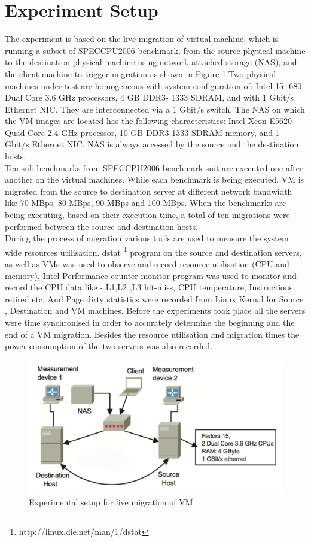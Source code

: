 \documentclass[a4paper,10pt,twoside]{article}
\begin{document}
\section{Experiment Setup}
The experiment is based on the live migration of virtual machine, which is running a subset of SPECCPU2006 benchmark, from the source physical machine to the destination physical machine using network attached storage (NAS), and the client machine to trigger migration as shown in Figure 1.Two physical machines under test are homogeneous with system configuration of:  Intel 15- 680 Dual Core 3.6 GHz processors, 4 GB DDR3- 1333 SDRAM, and with 1 Gbit/s Ethernet NIC. They are interconnected via a 1 Gbit/s switch. The NAS on which the VM images are located has the following characteristics: Intel Xeon E5620 Quad-Core 2.4 GHz processor, 10 GB DDR3-1333 SDRAM memory, and 1 Gbit/s Ethernet NIC. NAS is always accessed by the source and the destination hosts. \\
Ten sub benchmarks from SPECCPU2006 benchmark suit are executed one after another on the virtual machines. While each benchmark is being executed, VM is migrated from the source to destination server at different network bandwidth like 70 MBps, 80 MBps, 90 MBps and 100 MBps. When the benchmarks are being executing, based on their execution time, a total of ten migrations were performed between the source and destination hosts. \\
During the process of migration various tools are used to measure the system wide resources utilisation. dstat \footnote{http://linux.die.net/man/1/dstat} program on the source and destination servers, as well as VMs was used to observe and record resource utilisation (CPU and memory), Intel Performance counter monitor \cite{knight2004method} program was used to monitor and record the CPU data like - L1,L2 ,L3 hit-miss, CPU temperature, Instructions retired etc. And Page dirty statistics were recorded from Linux Kernal for Source , Destination and VM machines. Before the experiments took place all the servers were time synchronised in order to accurately determine the beginning and the end of a VM migration. Besides the resource utilisation and migration times the power consumption of the two servers was also recorded.
\begin{figure}[h]
\centering
\includegraphics[scale=0.5]{setup.png} 
\caption{Experimental setup for live migration of VM \cite{rybina2013investigation}}
\end{figure}
\end{document}
